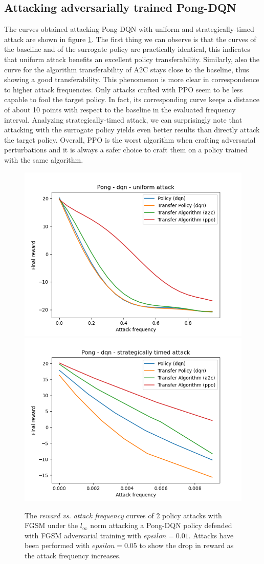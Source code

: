 \subsection{Attacking adversarially trained Pong-DQN}
The curves obtained attacking Pong-DQN with uniform and strategically-timed attack are shown in figure \ref{figure:pong-dqn-def}. The first thing we can observe is that the curves of the baseline and of the surrogate policy are practically identical, this indicates that uniform attack benefits an excellent policy transferability. Similarly, also the curve for the algorithm transferability of A2C stays close to the baseline, thus showing a good transferability. This phenomenon is more clear in correspondence to higher attack frequencies. Only attacks crafted with PPO seem to be less capable to fool the target policy. In fact, its corresponding curve keeps a distance of about 10 points with respect to the baseline in the evaluated frequency interval. Analyzing strategically-timed attack, we can surprisingly note that attacking with the surrogate policy yields even better results than directly attack the target policy. Overall, PPO is the worst algorithm when crafting adversarial perturbations and it is always a safer choice to craft them on a policy trained with the same algorithm. 

\begin{figure}
  \centering
    {\includegraphics[width=0.49\linewidth]{images/exp2/dqn-pong-uniform.png}}
    {\includegraphics[width=0.49\linewidth]{images/exp2/dqn-pong-strategically_timed.png}}
  \caption{The {\it reward vs. attack frequency} curves of 2 policy attacks with FGSM under the \(l_\infty\) norm attacking a Pong-DQN policy defended with FGSM adversarial training with \(epsilon=0.01\). Attacks have been performed with \(epsilon=0.05\) to show the drop in reward as the attack frequency increases.}
  \label{figure:pong-dqn-def}
\end{figure}

